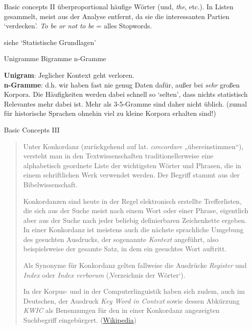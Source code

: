 \documentclass[10pt,a4paper]{article}
\begin{document}
\begin{multicols}{3}
\begin{textbox}{Basic concepts II}
 überproportional häufige Wörter (und, \emph{the}, etc.). In Listen gesammelt, meist aus der Analyse entfernt, da sie die interessanten Partien `verdecken'.
\emph{To be or not to be} = alles Stopwords.

 siehe `Statistische Grundlagen'
\end{textbox}

\begin{textbox}{Unigramme Bigramme n-Gramme}

\textbf{Unigram}: Jeglicher Kontext geht verloren. \\
\textbf{n-Gramme}: 
 d.h. wir haben fast nie genug Daten dafür, außer bei \emph{sehr} großen Korpora. Die Häufigkeiten werden dabei schnell so `selten', dass nichts statistisch Relevantes mehr dabei ist. Mehr als 3-5-Gramme sind daher nicht üblich. (zumal für historische Sprachen ohnehin viel zu kleine Korpora erhalten sind!)

\end{textbox}


\begin{textbox}{Basic Concepts III}

\begin{quote}\tiny
    Unter Konkordanz (zurückgehend auf lat. \emph{concordare} „übereinstimmen“), versteht man in den Textwissenschaften traditionellerweise eine alphabetisch geordnete Liste der wichtigsten Wörter und Phrasen, die in einem schriftlichen Werk verwendet werden. Der Begriff stammt aus der Bibelwissenschaft. \punkti

    Konkordanzen sind heute in der Regel elektronisch erstellte Trefferlisten, die sich aus der Suche meist nach einem Wort oder einer Phrase, eigentlich aber aus der Suche nach jeder beliebig definierbaren Zeichenkette ergeben. In einer Konkordanz ist meistens auch die nächste sprachliche Umgebung des gesuchten Ausdrucks, der sogenannte \emph{Kontext} angeführt, also beispielsweise der gesamte Satz, in dem ein gesuchtes Wort auftritt.
    
    Als Synonyme für Konkordanz gelten fallweise die Ausdrücke \emph{Register} und \emph{Index} oder \emph{Index verborum} (‚Verzeichnis der Wörter‘). 
    
    In der Korpus- und in der Computerlinguistik haben sich zudem, auch im Deutschen, der Ausdruck \emph{Key Word in Context} sowie dessen Abkürzung \emph{KWIC} als Benennungen für den in einer Konkordanz angezeigten Suchbegriff eingebürgert.  (\href{https://de.wikipedia.org/wiki/Konkordanz_(Textwissenschaft)}{Wikipedia})
\end{quote}


\end{textbox}
\end{multicols}
\end{document}
